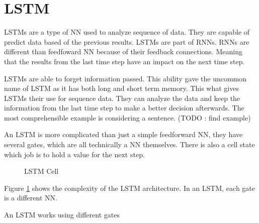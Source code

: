 \section{LSTM}\label{sec:lstm}
\acp{LSTM} are a type of \ac{NN} used to analyze sequence of data. They are capable of predict data based of the previous results. \acp{LSTM} are part of \acp{RNN}. \acp{RNN} are different than feedfoward \acl{NN} because of their feedback connections. Meaning that the results from the last time step have an impact on the next time step.

\acp{LSTM} are able to forget information passed. This ability gave the uncommon name of \acl{LSTM} as it has both long and short term memory. This what gives \acp{LSTM} their use for sequence data. They can analyze the data and keep the information from the last time step to make a better decision afterwards. The most comprehensible example is considering a sentence. (TODO : find example)

An \ac{LSTM} is more complicated than just a simple feedforward \acl{NN}, they have several gates, which are all technically a \ac{NN} themselves. There is also a cell state which job is to hold a value for the next step.

\begin{figure}[H]
  \centering
  
  \caption{LSTM Cell}
  \label{fig:lstmCell}
\end{figure}

Figure \ref{fig:lstmCell} shows the complexity of the \ac{LSTM} architecture. In an \ac{LSTM}, each gate is a different \ac{NN}.

An \ac{LSTM} works using different gates
